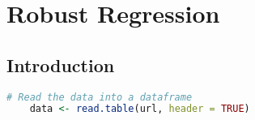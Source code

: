 \section{Robust Regression}

\subsection{Introduction}
\begin{lstlisting}[language=R]
    # Read the data into a dataframe
    data <- read.table(url, header = TRUE)
\end{lstlisting}
